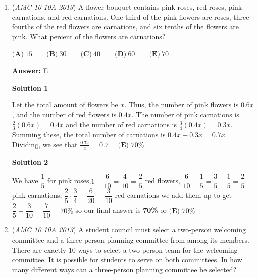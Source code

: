 \begin{enumerate}
\textbf{Solution 2}

The problem statement implies that it doesn't matter how many two-point shots or three-point shots are attempted. If we assume that Shenille only attempts three-pointers, then she makes $0.2 \cdot 30 = 6$ shots, which are worth $6 \cdot 3 = \boxed{\textbf{(B) }18}$ points. If we assume Shenille only attempts two-pointers, then she makes $0.3 \cdot 30 = 9$ shots, which are worth $9 \cdot 2 = 18$ points.

 


	\item (\textit{AMC 10 10A 2013}) A flower bouquet contains pink roses, red roses, pink carnations, and red carnations.  One third of the pink flowers are roses, three fourths of the red flowers are carnations, and six tenths of the flowers are pink.  What percent of the flowers are carnations?


 $\textbf{(A)}\ 15 \qquad\textbf{(B)}\ 30  \qquad\textbf{(C)}\ 40 \qquad\textbf{(D)}\ 60 \qquad\textbf{(E)}\ 70$

 \textbf{Answer: }E



\textbf{Solution 1}

Let the total amount of flowers be $x$.  Thus, the number of pink flowers is $0.6x$, and the number of red flowers is $0.4x$.  The number of pink carnations is $\frac{2}{3}(0.6x) = 0.4x$ and the number of red carnations is $\frac{3}{4}(0.4x) = 0.3x$.  Summing these, the total number of carnations is $0.4x+0.3x=0.7x$.  Dividing, we see that  $\frac{0.7x}{x} = 0.7 = \boxed{\textbf{(E) }70\%}$




\textbf{Solution 2}

We have $\dfrac15$ for pink roses,$1-\dfrac6{10}=\dfrac4{10}=\dfrac25$ red flowers, $\dfrac6{10}-\dfrac15=\dfrac35-\dfrac15=\dfrac25$ pink carnations, $\dfrac25\cdot \dfrac34=\dfrac6{20}=\dfrac3{10}$ red carnations we add them up to get $\dfrac25+\dfrac3{10}=\dfrac7{10}=70\%$ so our final answer is \textbf{70\%} or $\boxed{\textbf{(E) }70\%}$



	\item (\textit{AMC 10 10A 2013}) A student council must select a two-person welcoming committee and a three-person planning committee from among its members. There are exactly 10 ways to select a two-person team for the welcoming committee. It is possible for students to serve on both committees. In how many different ways can a three-person planning committee be selected?



\end{enumerate}
